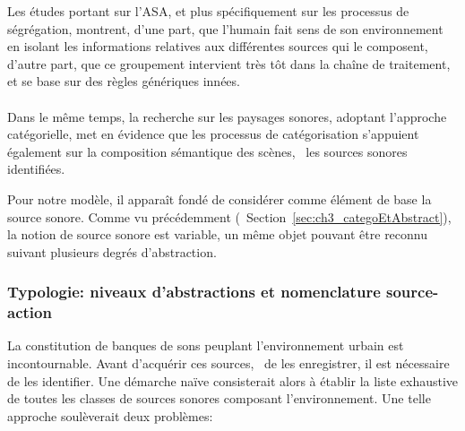 Les études portant sur l'ASA, et plus spécifiquement sur les processus de ségrégation, montrent, d'une part, que l'humain fait sens de son environnement en isolant les informations relatives aux différentes sources qui le composent, d'autre part, que ce groupement intervient très tôt dans la chaîne de traitement, et se base sur des règles génériques innées.\\

 \\ 

Dans le même temps, la recherche sur les paysages sonores, adoptant l’approche catégorielle, met en évidence que les processus de catégorisation s'appuient également sur la composition sémantique des scènes, \ie~les sources sonores identifiées. 

Pour notre modèle, il apparaît fondé de considérer comme élément de base la source sonore. Comme vu précédemment (\cf~Section~\ref{sec:ch3_categoEtAbstract}), la notion de source sonore est variable, un même objet pouvant être reconnu suivant plusieurs degrés d'abstraction.

\subsubsection{Typologie: niveaux d'abstractions et nomenclature source-action}
\label{sec:ch4_sourceAction}

La constitution de banques de sons peuplant l'environnement urbain est incontournable. Avant d'acquérir ces sources, \ie~de les enregistrer, il est nécessaire de les identifier. Une démarche naïve consisterait alors à établir la liste exhaustive de toutes les classes de sources sonores composant l'environnement. Une telle approche soulèverait deux problèmes:

